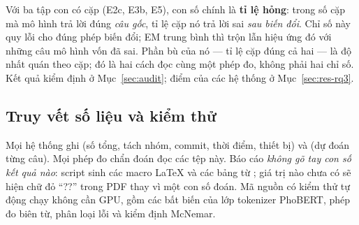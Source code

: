 Với ba tập con có cặp (E2c, E3b, E5), con số chính là \textbf{tỉ lệ hỏng}: trong số cặp mà mô
hình trả lời đúng \emph{câu gốc}, tỉ lệ cặp nó trả lời sai \emph{sau biến đổi}. Chỉ số này quy lỗi
cho đúng phép biến đổi; EM trung bình thì trộn lẫn hiệu ứng đó với những câu mô hình vốn đã sai.
Phần bù của nó --- tỉ lệ cặp đúng cả hai --- là độ nhất quán theo cặp; đó là hai cách đọc cùng một
phép đo, không phải hai chỉ số. Kết quả kiểm định ở Mục~\ref{sec:audit}; điểm của các hệ thống ở
Mục~\ref{sec:res-rq3}.

\subsection{Truy vết số liệu và kiểm thử}
\label{sec:traceability}

Mọi hệ thống ghi  (số tổng, tách nhóm, commit, thời
điểm, thiết bị) và  (dự đoán từng câu). Mọi
phép đo chẩn đoán đọc các tệp này. Báo cáo \emph{không gõ tay con số kết quả nào}: script
 sinh các macro \LaTeX{} và các bảng từ ; giá trị
nào chưa có sẽ hiện chữ đỏ ``??'' trong PDF thay vì một con số đoán. Mã nguồn có \NTests{} kiểm thử
tự động chạy không cần GPU, gồm các bất biến của lớp tokenizer PhoBERT, phép đo biên từ, phân
loại lỗi và kiểm định McNemar.
